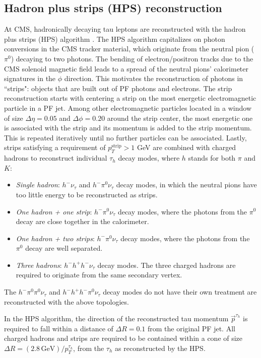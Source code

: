 \subsection{Hadron plus strips (HPS) reconstruction}
At CMS, hadronically decaying tau leptons are reconstructed with the hadron plus strips (HPS) algorithm \citep{CMS-TAU-14-001} \cite{2012-JINST-7-P01001}. The HPS algorithm capitalizes on photon conversions in the CMS tracker material, which originate from the neutral pion ($\pi^0$) decaying to two photons. The bending of electron/positron tracks due to the CMS solenoid magnetic field leads to a spread of the neutral pions' calorimeter signatures in the $\phi$ direction. This motivates the reconstruction of photons in ``strips": objects that are built out of PF photons and electrons. The strip reconstruction starts with centering a strip on the most energetic electromagnetic particle in a PF jet. Among other electromagnetic particles located in a window of size $\Delta \eta = 0.05$ and $\Delta \phi = 0.20$ around the strip center, the most energetic one is associated with the strip and its momentum is added to the strip momentum. This is repeated iteratively until no further particles can be associated. Lastly, strips satisfying a requirement of $p_{T}^{\text{strip}} > 1$ GeV are combined with charged hadrons to reconstruct individual $\tau_{h}$ decay modes, where $h$ stands for both $\pi$ and $K$:
\begin{itemize}
    \item \textit{Single hadron}: $h^- \nu_{\tau}$ and $h^- \pi^0 \nu_{\tau}$ decay modes, in which the neutral pions have too little energy to be reconstructed as strips.
    \item \textit{One hadron + one strip}: $h^- \pi^0 \nu_{\tau}$ decay modes, where the photons from the $\pi^0$ decay are close together in the calorimeter.
    \item \textit{One hadron + two strips}: $h^- \pi^0 \nu_{\tau}$ decay modes, where the photons from the $\pi^0$ decay are well separated. 
    \item \textit{Three hadrons}: $h^- h^+ h^- \nu_{\tau}$ decay modes. The three charged hadrons are required to originate from the same secondary vertex.
\end{itemize}
The $h^- \pi^0 \pi^0 \nu_{\tau}$ and $h^- h^+ h^- \pi^0 \nu_{\tau}$ decay modes do not have their own treatment are reconstructed with the above topologies. 

In the HPS algorithm, the direction of the reconstructed tau momentum $\vec{p}^{\tau_{h}}$ is required to fall within a distance of $\Delta R = 0.1$ from the original PF jet. All charged hadrons and strips are required to be contained within a cone of size $\Delta R = (2.8 \,\text{GeV})/p_{T}^{\tau_{h}}$, from the $\tau_{h}$ as reconstructed by the HPS. 

